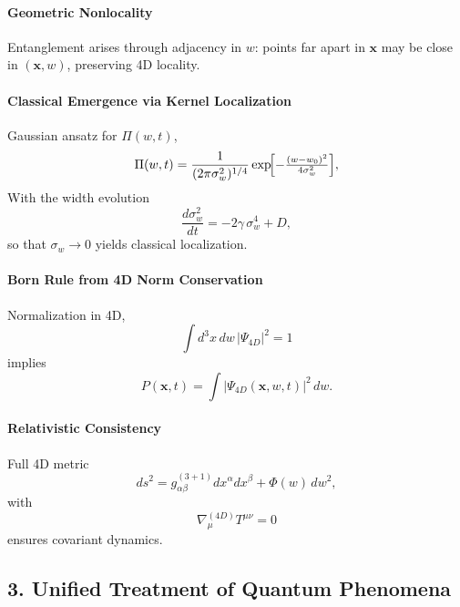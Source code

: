 \documentclass[12pt]{article}
\begin{document}
\paragraph{Geometric Nonlocality}  
Entanglement arises through adjacency in \(w\): points far apart in \(\mathbf{x}\) may be close in \((\mathbf{x},w)\), preserving 4D locality.

\paragraph{Classical Emergence via Kernel Localization}  
Gaussian ansatz for \(\Pi(w,t)\),
\begin{equation}
\Pi(w,t)
= \frac{1}{(2\pi\sigma_w^2)^{1/4}}
\exp\!\Bigl[-\tfrac{(w-w_0)^2}{4\sigma_w^2}\Bigr],
\end{equation}
With the width evolution
\begin{equation}
\frac{d\sigma_w^2}{dt}
= -2\gamma\,\sigma_w^4 + D,
\label{eq:sigma_evolution}
\end{equation}
so that \(\sigma_w\to0\) yields classical localization.

\paragraph{Born Rule from 4D Norm Conservation}  
Normalization in 4D,
\begin{equation}
\int d^3x\,dw\,|\Psi_{4D}|^2 = 1
\end{equation}
implies
\begin{equation}
P(\mathbf{x},t)=\int |\Psi_{4D}(\mathbf{x},w,t)|^2\,dw.
\label{eq:born_4d}
\end{equation}

\paragraph{Relativistic Consistency}  
Full 4D metric
\begin{equation}
ds^2 = g^{(3+1)}_{\alpha\beta}dx^\alpha dx^\beta + \Phi(w)\,dw^2,
\end{equation}
with
\begin{equation}
\nabla^{(4D)}_\mu T^{\mu\nu}=0
\end{equation}
ensures covariant dynamics.

\subsection*{3. Unified Treatment of Quantum Phenomena}
\end{document}
